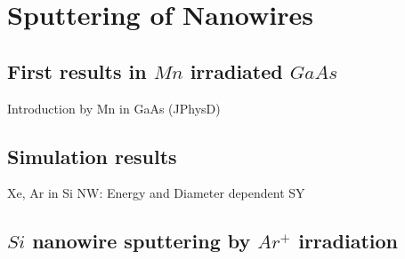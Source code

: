 \chapter{Sputtering of Nanowires}

\section{First results in $Mn$ irradiated $GaAs$}

Introduction by Mn in GaAs (JPhysD)


\section{Simulation results}

Xe, Ar in Si NW: Energy and Diameter dependent SY

\section{$Si$ nanowire sputtering by $Ar^+$ irradiation}
